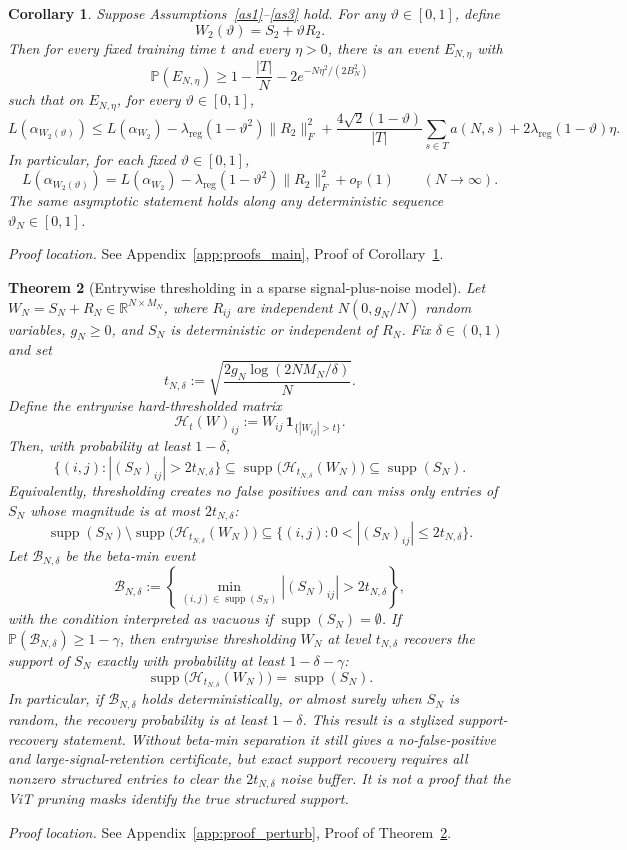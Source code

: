 \documentclass[11pt]{article}
\theoremstyle{plain}
\newtheorem{thm}{Theorem}[section]
\newtheorem{cor}[thm]{Corollary}
\theoremstyle{definition}
\theoremstyle{remark}
\newcommand{\R}{\mathbb{R}}
\newcommand{\PP}{\mathbb{P}}
\newcommand{\1}{\mathbf{1}}
\newcommand{\proofloc}[1]{\par\noindent\emph{Proof location.} #1\par}
\begin{document}
\begin{cor}
\label{cor:scaled_reduction_of_loss}
Suppose Assumptions~\ref{as1}--\ref{as3} hold. For any \(\vartheta\in[0,1]\), define
\[
W_2(\vartheta)=S_2+\vartheta R_2.
\]
Then for every fixed training time \(t\) and every \(\eta>0\), there is an event \(E_{N,\eta}\) with
\[
\PP(E_{N,\eta})
\ge
1-\frac{|T|}{N}-2e^{-N\eta^2/(2B_N^2)}
\]
such that on \(E_{N,\eta}\), for every \(\vartheta\in[0,1]\),
\[
L(\alpha_{W_2(\vartheta)})
\le
L(\alpha_{W_2})
-\lambda_{\mathrm{reg}}(1-\vartheta^2)\|R_2\|_F^2
+\frac{4\sqrt{2}(1-\vartheta)}{|T|}\sum_{s\in T}a(N,s)
+2\lambda_{\mathrm{reg}}(1-\vartheta)\eta.
\]
In particular, for each fixed \(\vartheta\in[0,1]\),
\[
L(\alpha_{W_2(\vartheta)})
=
L(\alpha_{W_2})
-\lambda_{\mathrm{reg}}(1-\vartheta^2)\|R_2\|_F^2
+o_{\PP}(1)
\qquad(N\to\infty).
\]
The same asymptotic statement holds along any deterministic sequence \(\vartheta_N\in[0,1]\).
\end{cor}
\proofloc{See Appendix~\ref{app:proofs_main}, Proof of Corollary~\ref{cor:scaled_reduction_of_loss}.}

\begin{thm}[Entrywise thresholding in a sparse signal-plus-noise model]
\label{thm:entrywise_threshold_support}
Let \(W_N=S_N+R_N\in\R^{N\times M_N}\), where \(R_{ij}\) are independent \(N(0,g_N/N)\) random variables, \(g_N\ge0\), and \(S_N\) is deterministic or independent of \(R_N\). Fix \(\delta\in(0,1)\) and set
\[
t_{N,\delta}
:=
\sqrt{\frac{2g_N\log(2NM_N/\delta)}{N}}.
\]
Define the entrywise hard-thresholded matrix
\[
\mathcal H_t(W)_{ij}:=W_{ij}\,\mathbf 1_{\{|W_{ij}|>t\}}.
\]
Then, with probability at least \(1-\delta\),
\[
\{(i,j): |(S_N)_{ij}|>2t_{N,\delta}\}
\subseteq
\operatorname{supp}\big(\mathcal H_{t_{N,\delta}}(W_N)\big)
\subseteq
\operatorname{supp}(S_N).
\]
Equivalently, thresholding creates no false positives and can miss only entries of \(S_N\) whose magnitude is at most \(2t_{N,\delta}\):
\[
\operatorname{supp}(S_N)\setminus
\operatorname{supp}\big(\mathcal H_{t_{N,\delta}}(W_N)\big)
\subseteq
\{(i,j):0< |(S_N)_{ij}|\le2t_{N,\delta}\}.
\]
Let \(\mathcal B_{N,\delta}\) be the beta-min event
\[
\mathcal B_{N,\delta}:=
\left\{
\min_{(i,j)\in\operatorname{supp}(S_N)} |(S_N)_{ij}|>2t_{N,\delta}
\right\},
\]
with the condition interpreted as vacuous if \(\operatorname{supp}(S_N)=\emptyset\). If \(\PP(\mathcal B_{N,\delta})\ge1-\gamma\), then entrywise thresholding \(W_N\) at level \(t_{N,\delta}\) recovers the support of \(S_N\) exactly with probability at least \(1-\delta-\gamma\):
\[
\operatorname{supp}\big(\mathcal H_{t_{N,\delta}}(W_N)\big)
=
\operatorname{supp}(S_N).
\]
In particular, if \(\mathcal B_{N,\delta}\) holds deterministically, or almost surely when \(S_N\) is random, the recovery probability is at least \(1-\delta\).
This result is a stylized support-recovery statement. Without beta-min separation it still gives a no-false-positive and large-signal-retention certificate, but exact support recovery requires all nonzero structured entries to clear the \(2t_{N,\delta}\) noise buffer. It is not a proof that the ViT pruning masks identify the true structured support.
\end{thm}
\proofloc{See Appendix~\ref{app:proof_perturb}, Proof of Theorem~\ref{thm:entrywise_threshold_support}.}
\end{document}
